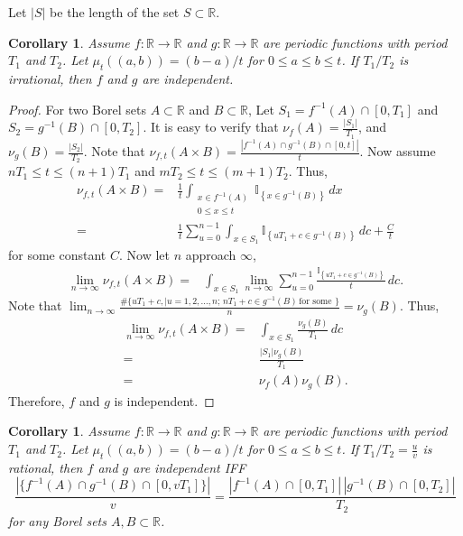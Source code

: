 \documentclass[english]{article} %
\newcommand{\todor}[2][]{\todo[color=Blue!10,#1]{#2}}
\newcommand{\ind}[1]{\mathbb{I}_{\left\{ #1 \right\}}}
\newcommand{\real}{\mathbb{R}}
\newtheorem{cor}[lemma]{Corollary}
\theoremstyle{definition}
\begin{document}
Let $|S|$ be the length of the set $S\subset \real$. 
\begin{cor}
Assume $f:\real\rightarrow\real$ and $g:\real\rightarrow\real$ are periodic functions with period $T_1$ and $T_2$. 
Let $\mu_t((a,b)) = (b-a)/t$ for $0\le a\le b\le t$. If $T_1/T_2$ is irrational, then $f$ and $g$ are independent. 
\end{cor}
\begin{proof}
 For two Borel sets $A\subset \real$ and $B\subset \real$, Let $S_1 =f^{-1}(A)\cap [0,T_1] $ and $ S_2 = g^{-1}(B)\cap [0,T_2]$. It is easy to verify that $\nu_f(A) = \frac{|S_1|}{T_1}$, and $\nu_g(B) = \frac{|S_2|}{T_2}$. 
 Note that $\nu_{f,t}(A\times B) = \frac{|f^{-1}(A)\cap g^{-1}(B)\cap [0,t] |}{t}$. Now assume $nT_1 \le t\le (n+1)T_1$ and $mT_2\le t \le (m+1)T_2$. Thus,
 \begin{align*}
 \nu_{f,t}(A\times B) = & \frac{1}{t} \int_{ \substack{x\in f^{-1}(A) \\ 0\le x \le t}} \ind{x\in g^{-1}(B)}\, dx \\
 					=	& \frac{1}{t} \sum_{u=0}^{n-1} \int_{x\in S_1} \ind{uT_1+c \in g^{-1}(B)}\, dc + \frac{C}{t}
 \end{align*}
 for some constant $C$. Now let $n$ approach $\infty$,
 \begin{align*}
  \lim\limits_{n\rightarrow \infty} \nu_{f,t}(A\times B) = & \int_{x\in S_1} \lim\limits_{n\rightarrow \infty} \sum_{u=0}^{n-1} \frac{\ind{uT_1+c \in g^{-1}(B)}}{t} \, dc.
 \end{align*}
 Note that $\lim_{n\rightarrow \infty}\frac{\#\{uT_1+c, \vert u = 1,2,\ldots, n; \, nT_1+c \in g^{-1}(B)\, \text{for some }\}}{n} = \nu_{g}(B)$. 
 \todor{how to prove it?} Thus, 
 \begin{align*}
 \lim\limits_{n\rightarrow \infty} \nu_{f,t}(A\times B) = & \int_{x\in S_1} \frac{\nu_g(B)}{T_1}\, dc \\
 														= & \frac{|S_1|\nu_g(B)}{T_1} \\
 														= & \nu_f(A)\nu_g(B).
 \end{align*}
 Therefore, $f$ and $g$ is independent.
\end{proof}

\begin{cor}
Assume $f:\real\rightarrow\real$ and $g:\real\rightarrow\real$ are periodic functions with period $T_1$ and $T_2$. 
Let $\mu_t((a,b)) = (b-a)/t$ for $0\le a\le b\le t$.  
If $T_1/T_2 = \frac{u}{v}$ is rational, then $f$ and $g$ are independent IFF 
\[
\frac{|\{f^{-1}(A)\cap g^{-1}(B) \cap [0,vT_1]\}|}{v} = \frac{|f^{-1}(A)\cap [0,T_1]| \,|g^{-1}(B)\cap [0,T_2]|}{T_2}
\]
for any Borel sets $A,B\subset \real$.
\end{cor}
\end{document}
